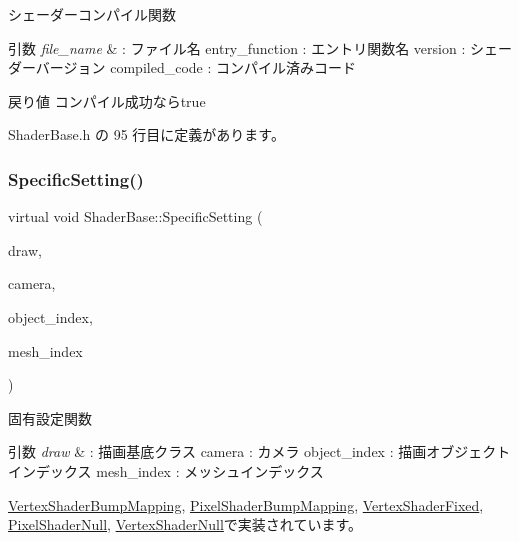 シェーダーコンパイル関数 


\begin{DoxyParams}{引数}
{\em file\+\_\+name} & \+: ファイル名 entry\+\_\+function \+: エントリ関数名 version \+: シェーダーバージョン compiled\+\_\+code \+: コンパイル済みコード \\
\hline
\end{DoxyParams}
\begin{DoxyReturn}{戻り値}
コンパイル成功ならtrue 
\end{DoxyReturn}


 Shader\+Base.\+h の 95 行目に定義があります。

\mbox{\label{class_shader_base_ac78c78ede3b8e48cf28b739b97456620}} 
\subsubsection{\texorpdfstring{Specific\+Setting()}{SpecificSetting()}}
{\footnotesize\ttfamily virtual void Shader\+Base\+::\+Specific\+Setting (\begin{DoxyParamCaption}\item[{\mbox{\hyperlink{class_draw_base}{Draw\+Base}} $\ast$}]{draw,  }\item[{\mbox{\hyperlink{class_camera}{Camera}} $\ast$}]{camera,  }\item[{unsigned}]{object\+\_\+index,  }\item[{unsigned}]{mesh\+\_\+index }\end{DoxyParamCaption})\hspace{0.3cm}{\ttfamily [pure virtual]}}



固有設定関数 


\begin{DoxyParams}{引数}
{\em draw} & \+: 描画基底クラス camera \+: カメラ object\+\_\+index \+: 描画オブジェクトインデックス mesh\+\_\+index \+: メッシュインデックス \\
\hline
\end{DoxyParams}


\mbox{\hyperlink{class_vertex_shader_bump_mapping_ad81d57336763441c4071f967b57dbce1}{Vertex\+Shader\+Bump\+Mapping}}, \mbox{\hyperlink{class_pixel_shader_bump_mapping_afa80c2404b490a444d54cc47c681ca8f}{Pixel\+Shader\+Bump\+Mapping}}, \mbox{\hyperlink{class_vertex_shader_fixed_a87523c320f6f6767d59d7b24265db7ec}{Vertex\+Shader\+Fixed}}, \mbox{\hyperlink{class_pixel_shader_null_a8dd0194b5a22da5261ab35233a7cfdcd}{Pixel\+Shader\+Null}}, \mbox{\hyperlink{class_vertex_shader_null_aa2234c6ea083e3c0233d59f222145992}{Vertex\+Shader\+Null}}で実装されています。

